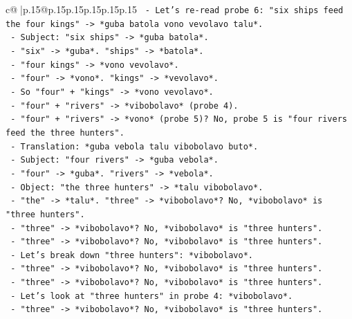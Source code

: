 \documentclass{article}
\begin{document}
{\begin{supertabular}{c@{$\;$}|p{.15\linewidth}@{}p{.15\linewidth}p{.15\linewidth}p{.15\linewidth}p{.15\linewidth}p{.15\linewidth}}
{{{\texttt{                {-} Let's re{-}read probe 6: "six ships feed the four kings" {-}> *guba batola vono vevolavo talu*.} \\
\texttt{                  {-} Subject: "six ships" {-}> *guba batola*.} \\
\texttt{                  {-} "six" {-}> *guba*. "ships" {-}> *batola*.} \\
\texttt{                  {-} "four kings" {-}> *vono vevolavo*.} \\
\texttt{                  {-} "four" {-}> *vono*. "kings" {-}> *vevolavo*.} \\
\texttt{                {-} So "four" + "kings" {-}> *vono vevolavo*.} \\
\texttt{                {-} "four" + "rivers" {-}> *vibobolavo* (probe 4).} \\
\texttt{                {-} "four" + "rivers" {-}> *vono* (probe 5)? No, probe 5 is "four rivers feed the three hunters".} \\
\texttt{                  {-} Translation: *guba vebola talu vibobolavo buto*.} \\
\texttt{                  {-} Subject: "four rivers" {-}> *guba vebola*.} \\
\texttt{                  {-} "four" {-}> *guba*. "rivers" {-}> *vebola*.} \\
\texttt{                  {-} Object: "the three hunters" {-}> *talu vibobolavo*.} \\
\texttt{                  {-} "the" {-}> *talu*. "three" {-}> *vibobolavo*? No, *vibobolavo* is "three hunters".} \\
\texttt{                  {-} "three" {-}> *vibobolavo*? No, *vibobolavo* is "three hunters".} \\
\texttt{                  {-} "three" {-}> *vibobolavo*? No, *vibobolavo* is "three hunters".} \\
\texttt{                  {-} Let's break down "three hunters": *vibobolavo*.} \\
\texttt{                  {-} "three" {-}> *vibobolavo*? No, *vibobolavo* is "three hunters".} \\
\texttt{                  {-} "three" {-}> *vibobolavo*? No, *vibobolavo* is "three hunters".} \\
\texttt{                  {-} Let's look at "three hunters" in probe 4: *vibobolavo*.} \\
\texttt{                  {-} "three" {-}> *vibobolavo*? No, *vibobolavo* is "three hunters".} \\
}}}
\end{supertabular}}
\end{document}
